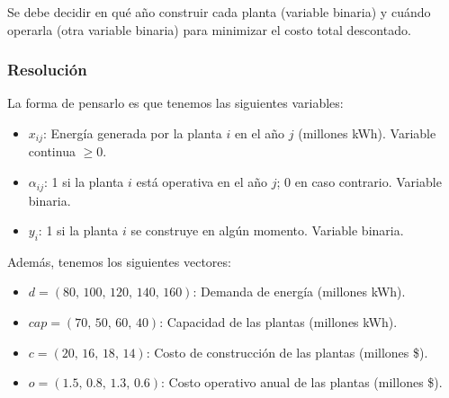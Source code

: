 \documentclass[12pt]{article}
\begin{document}
\begin{table}[H]
    \centering
\end{table}

Se debe decidir en qué año construir cada planta (variable binaria) y cuándo operarla (otra variable binaria) para minimizar el costo total descontado.

\subsubsection{Resolución}

La forma de pensarlo es que tenemos las siguientes variables:

\begin{itemize}[label=$\rightarrow$]
    \item $x_{ij}$: Energía generada por la planta $i$ en el año $j$ (millones kWh). Variable continua $\ge 0$.
    \item $\alpha_{ij}$: 1 si la planta $i$ está operativa en el año $j$; 0 en caso contrario. Variable binaria.
    \item $y_i$: 1 si la planta $i$ se construye en algún momento. Variable binaria.
\end{itemize}

Además, tenemos los siguientes vectores:

\begin{itemize}[label=$\rightarrow$]
    \item $d = (80,\,100,\,120,\,140,\,160)$: Demanda de energía (millones kWh).
    \item $cap = (70,\,50,\,60,\,40)$: Capacidad de las plantas (millones kWh).
    \item $c = (20,\,16,\,18,\,14)$: Costo de construcción de las plantas (millones \$).
    \item $o = (1.5,\,0.8,\,1.3,\,0.6)$: Costo operativo anual de las plantas (millones \$).
\end{itemize}
\end{document}
